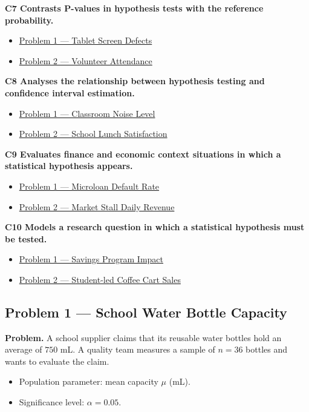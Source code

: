	\noindent\textbf{C7 Contrasts P-values in hypothesis tests with the reference probability.}
	\begin{itemize}
		\item \hyperlink{c7-ex1}{Problem 1 — Tablet Screen Defects}
		\item \hyperlink{c7-ex2}{Problem 2 — Volunteer Attendance}
	\end{itemize}
	\noindent\textbf{C8 Analyses the relationship between hypothesis testing and confidence interval estimation.}
	\begin{itemize}
		\item \hyperlink{c8-ex1}{Problem 1 — Classroom Noise Level}
		\item \hyperlink{c8-ex2}{Problem 2 — School Lunch Satisfaction}
	\end{itemize}
	\noindent\textbf{C9 Evaluates finance and economic context situations in which a statistical hypothesis appears.}
	\begin{itemize}
		\item \hyperlink{c9-ex1}{Problem 1 — Microloan Default Rate}
		\item \hyperlink{c9-ex2}{Problem 2 — Market Stall Daily Revenue}
	\end{itemize}
	\noindent\textbf{C10 Models a research question in which a statistical hypothesis must be tested.}
	\begin{itemize}
		\item \hyperlink{c10-ex1}{Problem 1 — Savings Program Impact}
		\item \hyperlink{c10-ex2}{Problem 2 — Student-led Coffee Cart Sales}
	\end{itemize}
	
	
	\hypertarget{c1-ex1}{}
	\subsection*{Problem 1 — School Water Bottle Capacity}
	
	\textbf{Problem.} A school supplier claims that its reusable water bottles hold an average of $750$ mL. A quality team measures a sample of $n=36$ bottles and wants to evaluate the claim.
	\begin{itemize}
		\item Population parameter: mean capacity $\mu$ (mL).
		\item Significance level: $\alpha=0.05$.
	\end{itemize}
	
